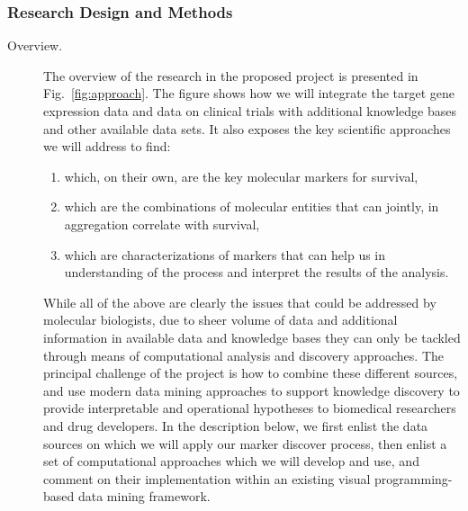 \documentclass[11pt,a4paper]{article}
\begin{document}
\subsubsection{Research Design and Methods}
\begin{description}
	\item[Overview.] 
The overview of the research in the proposed project is presented in Fig.~\ref{fig:approach}. The figure shows how we will integrate the target gene expression data and data on clinical trials with additional knowledge bases and other available data sets. It also exposes the key scientific approaches we will address to find:
\begin{enumerate}
\item which, on their own, are the key molecular markers for survival,
\item which are the combinations of molecular entities that can jointly, in aggregation correlate with survival,
\item which are characterizations of markers that can help us in understanding of the process and interpret the results of the analysis.
\end{enumerate}
While all of the above are clearly the issues that could be addressed by molecular biologists, due to sheer volume of data and additional information in available data and knowledge bases they can only be tackled through means of computational analysis and discovery approaches. The principal challenge of the project is how to combine these different sources, and use modern data mining approaches to support knowledge discovery to provide interpretable and operational hypotheses to biomedical researchers and drug developers. In the description below, we first enlist the data sources on which we will apply our marker discover process, then enlist a set of computational approaches which we will develop and use, and comment on their implementation within an existing visual programming-based data mining framework.


\end{description}
\end{document}
